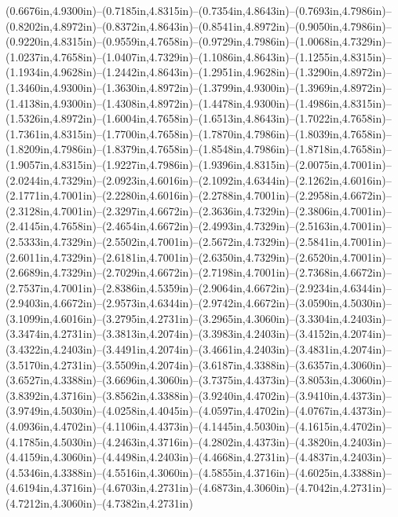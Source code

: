 (0.6676in,4.9300in)--(0.7185in,4.8315in)--(0.7354in,4.8643in)--(0.7693in,4.7986in)--(0.8202in,4.8972in)--(0.8372in,4.8643in)--(0.8541in,4.8972in)--(0.9050in,4.7986in)--(0.9220in,4.8315in)--(0.9559in,4.7658in)--(0.9729in,4.7986in)--(1.0068in,4.7329in)--(1.0237in,4.7658in)--(1.0407in,4.7329in)--(1.1086in,4.8643in)--(1.1255in,4.8315in)--(1.1934in,4.9628in)--(1.2442in,4.8643in)--(1.2951in,4.9628in)--(1.3290in,4.8972in)--(1.3460in,4.9300in)--(1.3630in,4.8972in)--(1.3799in,4.9300in)--(1.3969in,4.8972in)--(1.4138in,4.9300in)--(1.4308in,4.8972in)--(1.4478in,4.9300in)--(1.4986in,4.8315in)--(1.5326in,4.8972in)--(1.6004in,4.7658in)--(1.6513in,4.8643in)--(1.7022in,4.7658in)--(1.7361in,4.8315in)--(1.7700in,4.7658in)--(1.7870in,4.7986in)--(1.8039in,4.7658in)--(1.8209in,4.7986in)--(1.8379in,4.7658in)--(1.8548in,4.7986in)--(1.8718in,4.7658in)--(1.9057in,4.8315in)--(1.9227in,4.7986in)--(1.9396in,4.8315in)--(2.0075in,4.7001in)--(2.0244in,4.7329in)--(2.0923in,4.6016in)--(2.1092in,4.6344in)--(2.1262in,4.6016in)--(2.1771in,4.7001in)--(2.2280in,4.6016in)--(2.2788in,4.7001in)--(2.2958in,4.6672in)--(2.3128in,4.7001in)--(2.3297in,4.6672in)--(2.3636in,4.7329in)--(2.3806in,4.7001in)--(2.4145in,4.7658in)--(2.4654in,4.6672in)--(2.4993in,4.7329in)--(2.5163in,4.7001in)--(2.5333in,4.7329in)--(2.5502in,4.7001in)--(2.5672in,4.7329in)--(2.5841in,4.7001in)--(2.6011in,4.7329in)--(2.6181in,4.7001in)--(2.6350in,4.7329in)--(2.6520in,4.7001in)--(2.6689in,4.7329in)--(2.7029in,4.6672in)--(2.7198in,4.7001in)--(2.7368in,4.6672in)--(2.7537in,4.7001in)--(2.8386in,4.5359in)--(2.9064in,4.6672in)--(2.9234in,4.6344in)--(2.9403in,4.6672in)--(2.9573in,4.6344in)--(2.9742in,4.6672in)--(3.0590in,4.5030in)--(3.1099in,4.6016in)--(3.2795in,4.2731in)--(3.2965in,4.3060in)--(3.3304in,4.2403in)--(3.3474in,4.2731in)--(3.3813in,4.2074in)--(3.3983in,4.2403in)--(3.4152in,4.2074in)--(3.4322in,4.2403in)--(3.4491in,4.2074in)--(3.4661in,4.2403in)--(3.4831in,4.2074in)--(3.5170in,4.2731in)--(3.5509in,4.2074in)--(3.6187in,4.3388in)--(3.6357in,4.3060in)--(3.6527in,4.3388in)--(3.6696in,4.3060in)--(3.7375in,4.4373in)--(3.8053in,4.3060in)--(3.8392in,4.3716in)--(3.8562in,4.3388in)--(3.9240in,4.4702in)--(3.9410in,4.4373in)--(3.9749in,4.5030in)--(4.0258in,4.4045in)--(4.0597in,4.4702in)--(4.0767in,4.4373in)--(4.0936in,4.4702in)--(4.1106in,4.4373in)--(4.1445in,4.5030in)--(4.1615in,4.4702in)--(4.1785in,4.5030in)--(4.2463in,4.3716in)--(4.2802in,4.4373in)--(4.3820in,4.2403in)--(4.4159in,4.3060in)--(4.4498in,4.2403in)--(4.4668in,4.2731in)--(4.4837in,4.2403in)--(4.5346in,4.3388in)--(4.5516in,4.3060in)--(4.5855in,4.3716in)--(4.6025in,4.3388in)--(4.6194in,4.3716in)--(4.6703in,4.2731in)--(4.6873in,4.3060in)--(4.7042in,4.2731in)--(4.7212in,4.3060in)--(4.7382in,4.2731in)
